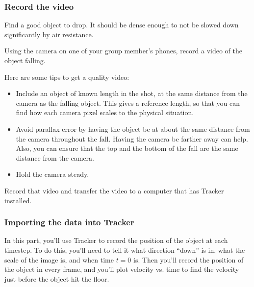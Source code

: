 \subsubsection{Record the video}

\begin{steps}
	\item Find a good object to drop. It should be dense enough to not be slowed down significantly by air resistance.
	
	\item Using the camera on one of your group member's phones, record a video of the object falling.
	
	Here are some tips to get a quality video:
	\begin{itemize}
		\item Include an object of known length in the shot, at the same distance from the camera as the falling object. This gives a reference length, so that you can find how each camera pixel scales to the physical situation.
		
		\item Avoid parallax error by having the object be at about the same distance from the camera throughout the fall. Having the camera be farther away can help. Also, you can ensure that the top and the bottom of the fall are the same distance from the camera.
		
		\item Hold the camera steady.
	\end{itemize}
	
	\item Record that video and transfer the video to a computer that has Tracker installed.
\end{steps}

\subsubsection{Importing the data into Tracker}

In this part, you'll use Tracker to record the position of the object at each timestep. To do this, you'll need to tell it what direction ``down'' is in, what the scale of the image is, and when time $t=0$ is. Then you'll record the position of the object in every frame, and you'll plot velocity vs. time to find the velocity just before the object hit the floor.

